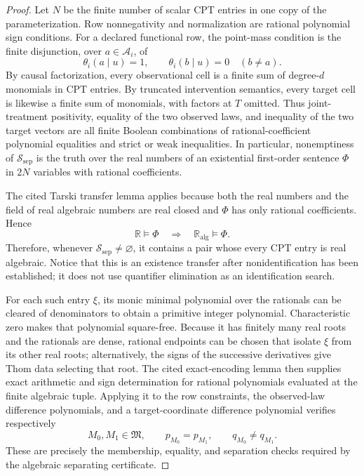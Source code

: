 \documentclass{article}
\begin{document}
\begin{proof}
Let \(N\) be the finite number of scalar CPT entries in one copy of the parameterization.  Row nonnegativity and normalization are rational polynomial sign conditions.  For a declared functional row, the point-mass condition is the finite disjunction, over \(a\in\mathcal A_i\), of
\[
 \theta_i(a\mid u)=1,
 \qquad
 \theta_i(b\mid u)=0\quad(b\ne a).
\]
By causal factorization, every observational cell is a finite sum of degree-\(d\) monomials in CPT entries.  By truncated intervention semantics, every target cell is likewise a finite sum of monomials, with factors at \(T\) omitted.  Thus joint-treatment positivity, equality of the two observed laws, and inequality of the two target vectors are all finite Boolean combinations of rational-coefficient polynomial equalities and strict or weak inequalities.  In particular, nonemptiness of \(\mathcal S_{\mathrm{sep}}\) is the truth over the real numbers of an existential first-order sentence \(\Phi\) in \(2N\) variables with rational coefficients.

The cited Tarski transfer lemma applies because both the real numbers and the field of real algebraic numbers are real closed and \(\Phi\) has only rational coefficients.  Hence
\[
 \mathbb R\models\Phi
 \quad\Longrightarrow\quad
 \mathbb R_{\mathrm{alg}}\models\Phi.
\]
Therefore, whenever \(\mathcal S_{\mathrm{sep}}\ne\varnothing\), it contains a pair whose every CPT entry is real algebraic.  Notice that this is an existence transfer after nonidentification has been established; it does not use quantifier elimination as an identification search.

For each such entry \(\xi\), its monic minimal polynomial over the rationals can be cleared of denominators to obtain a primitive integer polynomial.  Characteristic zero makes that polynomial square-free.  Because it has finitely many real roots and the rationals are dense, rational endpoints can be chosen that isolate \(\xi\) from its other real roots; alternatively, the signs of the successive derivatives give Thom data selecting that root.  The cited exact-encoding lemma then supplies exact arithmetic and sign determination for rational polynomials evaluated at the finite algebraic tuple.  Applying it to the row constraints, the observed-law difference polynomials, and a target-coordinate difference polynomial verifies respectively
\[
 M_0,M_1\in\mathfrak M,
 \qquad p_{M_0}=p_{M_1},
 \qquad q_{M_0}\ne q_{M_1}.
\]
These are precisely the membership, equality, and separation checks required by the algebraic separating certificate.
\end{proof}
\end{document}
